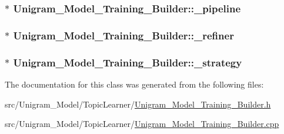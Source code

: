 \hypertarget{class_unigram___model___training___builder_a45916934a9ad507fae26423b4f264723}{
\subsubsection[{\_\-pipeline}]{$\ast$ {\bf Unigram\_\-Model\_\-Training\_\-Builder::\_\-pipeline}}}
\label{class_unigram___model___training___builder_a45916934a9ad507fae26423b4f264723}
\hypertarget{class_unigram___model___training___builder_a4afccdf5cdd23d88883e4b7793345cd6}{
\subsubsection[{\_\-refiner}]{$\ast$ {\bf Unigram\_\-Model\_\-Training\_\-Builder::\_\-refiner}}}
\label{class_unigram___model___training___builder_a4afccdf5cdd23d88883e4b7793345cd6}
\hypertarget{class_unigram___model___training___builder_a15d25a41a50233e6856e14c4eb445628}{
\subsubsection[{\_\-strategy}]{$\ast$ {\bf Unigram\_\-Model\_\-Training\_\-Builder::\_\-strategy}}}
\label{class_unigram___model___training___builder_a15d25a41a50233e6856e14c4eb445628}


The documentation for this class was generated from the following files:\begin{DoxyCompactItemize}
\item 
src/Unigram\_\-Model/TopicLearner/\hyperlink{_unigram___model___training___builder_8h}{Unigram\_\-Model\_\-Training\_\-Builder.h}\item 
src/Unigram\_\-Model/TopicLearner/\hyperlink{_unigram___model___training___builder_8cpp}{Unigram\_\-Model\_\-Training\_\-Builder.cpp}\end{DoxyCompactItemize}
